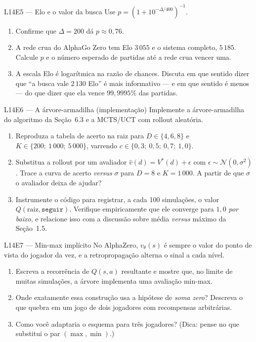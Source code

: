 \documentclass[11pt]{article}
\newcommand{\redeval}{v_{\theta}}
\begin{document}
\begin{exbox}{L14E5 — Elo e o valor da busca}
Use $p = (1 + 10^{-\Delta/400})^{-1}$.
\begin{enumerate}
  \item Confirme que $\Delta = 200$ dá $p \approx 0{,}76$.
  \item A rede crua do AlphaGo Zero tem Elo $3\,055$ e o sistema completo,
        $5\,185$. Calcule $p$ e o número esperado de partidas até a rede crua
        vencer uma.
  \item A escala Elo é logarítmica na razão de chances. Discuta em que sentido
        dizer que ``a busca vale $2\,130$ Elo'' é mais informativo — e em que
        sentido é menos — do que dizer que ela vence $99{,}9995\%$ das partidas.
\end{enumerate}
\end{exbox}

\begin{exbox}{L14E6 — A árvore-armadilha \normalfont(implementação)}
Implemente a árvore-armadilha do algoritmo da Seção~6.3 e a MCTS/UCT com rollout
aleatória.
\begin{enumerate}
  \item Reproduza a tabela de acerto na raiz para $D \in \{4,6,8\}$ e
        $K \in \{200;\ 1\,000;\ 5\,000\}$, varrendo $c \in \{0{,}3;\ 0{,}5;\ 0{,}7;\ 1{,}0\}$.
  \item Substitua a rollout por um avaliador $\widehat{v}(d) = V^{*}(d) + \epsilon$
        com $\epsilon \sim \mathcal{N}(0,\sigma^2)$. Trace a curva de acerto
        \emph{versus} $\sigma$ para $D = 8$ e $K = 1\,000$. A partir de que $\sigma$
        o avaliador deixa de ajudar?
  \item Instrumente o código para registrar, a cada 100 simulações, o valor
        $Q(\text{raiz},\texttt{seguir})$. Verifique empiricamente que ele converge
        para $1{,}0$ \emph{por baixo}, e relacione isso com a discussão sobre
        média \emph{versus} máximo da Seção~1.5.
\end{enumerate}
\end{exbox}

\begin{exbox}{L14E7 — Min-max implícito}
No AlphaZero, $\redeval(s)$ é sempre o valor do ponto de vista do jogador da vez, e
a retropropagação alterna o sinal a cada nível.
\begin{enumerate}
  \item Escreva a recorrência de $Q(s,a)$ resultante e mostre que, no limite de
        muitas simulações, a árvore implementa uma avaliação min-max.
  \item Onde exatamente essa construção usa a hipótese de \emph{soma zero}?
        Descreva o que quebra em um jogo de dois jogadores com recompensas
        arbitrárias.
  \item Como você adaptaria o esquema para três jogadores? (Dica: pense no que
        substitui o par $(\max,\min)$.)
\end{enumerate}
\end{exbox}
\end{document}
